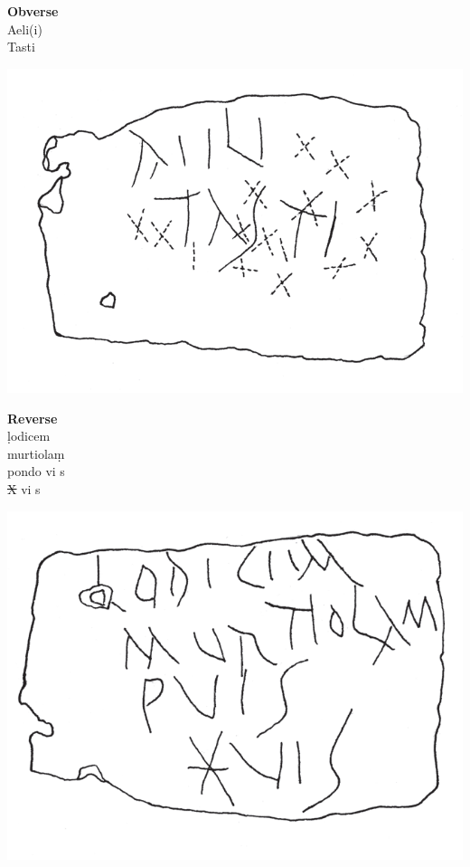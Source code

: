 \documentclass[amsthm,ebook]{saparticle}
\begin{document}
\vspace{0,5cm}
\begin{minipage}[t]{0.18\textwidth}
\textbf{Obverse}\\
Aeli(i)\\
Tasti
\end{minipage}
\begin{minipage}[c]{0.27\textwidth}
\includegraphics[width=\columnwidth]{EAGLE16lameetalteaching-img006.png}
\end{minipage}
\begin{minipage}[t]{0.18\textwidth}
\textbf{Reverse}\\
\d{l}odicem\\
murtiola\d{m}\\
pondo vi s\\
\sout{X} vi s\\
\end{minipage}
\begin{minipage}[c]{0.25\textwidth}
\includegraphics[width=\columnwidth]{EAGLE16lameetalteaching-img007.png}
\end{minipage}
\end{document}
